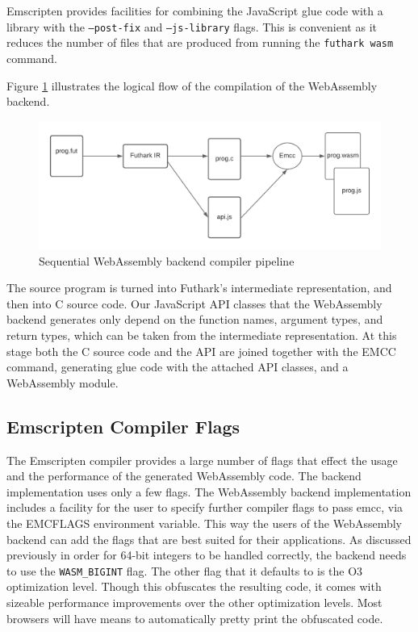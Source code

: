 \documentclass[11pt]{book}
\begin{document}
Emscripten provides facilities for combining the JavaScript glue code with a library with the \texttt{--post-fix} and \texttt{--js-library} flags. This is convenient as it reduces the number of files that are produced from running the \texttt{futhark wasm} command.

Figure \ref{fig:wasm} illustrates the logical flow of the compilation of the WebAssembly backend. 

\begin{figure}[htbp]
\centerline{\includegraphics[width=\textwidth]{figures/compiler_pipeline.png}}
\caption{Sequential WebAssembly backend compiler pipeline}
\label{fig:wasm}
\end{figure}

The source program is turned into Futhark's intermediate representation, and then into C source code. Our JavaScript API classes that the WebAssembly backend generates only depend on the function names, argument types, and return types, which can be taken from the intermediate representation. At this stage both the C source code and the API are joined together with the EMCC command, generating glue code with the attached API classes, and a WebAssembly module. 

\subsection{Emscripten Compiler Flags}
The Emscripten compiler provides a large number of flags that effect the usage and the performance of the generated WebAssembly code. The backend implementation uses only a few flags. The WebAssembly backend implementation includes a facility for the user to specify further compiler flags to pass emcc, via the EMCFLAGS environment variable. This way the users of the WebAssembly backend can add the flags that are best suited for their applications. As discussed previously in order for 64-bit integers to be handled correctly, the backend needs to use the \texttt{WASM\_BIGINT} flag. The other flag that it defaults to is the O3 optimization level. Though this obfuscates the resulting code, it comes with sizeable performance improvements over the other optimization levels. Most browsers will have means to automatically pretty print the obfuscated code.
\end{document}
